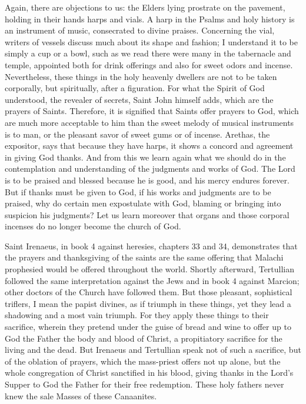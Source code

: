 Again, there are objections to us: the Elders lying prostrate on the pavement, holding in their hands harps and vials. A harp in the Psalms and holy history is an instrument of music, consecrated to divine praises. Concerning the vial, writers of vessels discuss much about its shape and fashion; I understand it to be simply a cup or a bowl, such as we read there were many in the tabernacle and temple, appointed both for drink offerings and also for sweet odors and incense. Nevertheless, these things in the holy heavenly dwellers are not to be taken corporally, but spiritually, after a figuration. For what the Spirit of God understood, the revealer of secrets, Saint John himself adds, which are the prayers of Saints. Therefore, it is signified that Saints offer prayers to God, which are much more acceptable to him than the sweet melody of musical instruments is to man, or the pleasant savor of sweet gums or of incense. Arethas, the expositor, says that because they have harps, it shows a concord and agreement in giving God thanks. And from this we learn again what we should do in the contemplation and understanding of the judgments and works of God. The Lord is to be praised and blessed because he is good, and his mercy endures forever. But if thanks must be given to God, if his works and judgments are to be praised, why do certain men expostulate with God, blaming or bringing into suspicion his judgments? Let us learn moreover that organs and those corporal incenses do no longer become the church of God.

Saint Irenaeus, in book 4 against heresies, chapters 33 and 34, demonstrates that the prayers and thanksgiving of the saints are the same offering that Malachi prophesied would be offered throughout the world. Shortly afterward, Tertullian followed the same interpretation against the Jews and in book 4 against Marcion; other doctors of the Church have followed them. But those pleasant, sophistical triflers, I mean the papist divines, as if triumph in these things, yet they lead a shadowing and a most vain triumph. For they apply these things to their sacrifice, wherein they pretend under the guise of bread and wine to offer up to God the Father the body and blood of Christ, a propitiatory sacrifice for the living and the dead. But Irenaeus and Tertullian speak not of such a sacrifice, but of the oblation of prayers, which the mass-priest offers not up alone, but the whole congregation of Christ sanctified in his blood, giving thanks in the Lord’s Supper to God the Father for their free redemption. These holy fathers never knew the sale Masses of these Canaanites.

